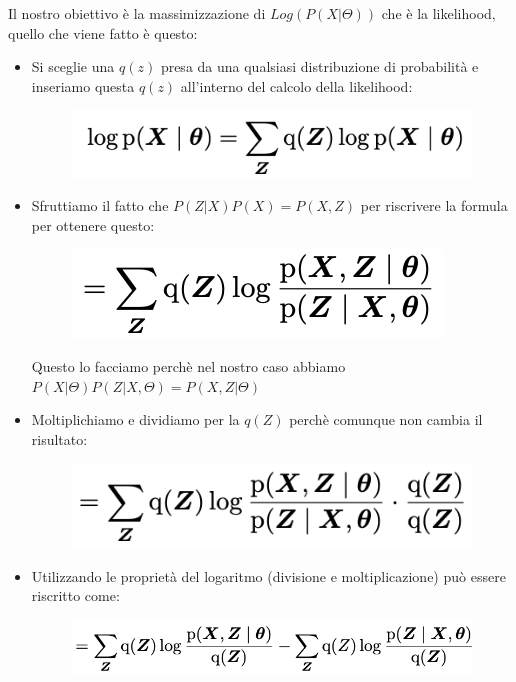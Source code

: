 \documentclass[14pt]{extreport}
\begin{document}
Il nostro obiettivo è la massimizzazione di $Log(P(X|\Theta))$ che è la likelihood, quello che viene fatto è questo:
\begin{itemize}
	\item Si sceglie una $q(z)$ presa da una qualsiasi distribuzione di probabilità e inseriamo questa $q(z)$ all'interno del calcolo della
	likelihood:
	      \begin{figure}[H]
		      \centering
		      \includegraphics[width=0.7\linewidth]{558.jpeg}
	      \end{figure}
	\item Sfruttiamo il fatto che $P(Z|X)P(X) = P(X,Z)$ per riscrivere la formula per ottenere questo:
	      \begin{figure}[H]
		      \centering
		      \includegraphics[width=0.7\linewidth]{559.jpeg}
	      \end{figure}
	      Questo lo facciamo perchè nel nostro caso abbiamo $P(X|\Theta)P(Z|X,\Theta) = P(X,Z|\Theta)$
	\item Moltiplichiamo e dividiamo per la $q(Z)$ perchè comunque non cambia il risultato:
	      \begin{figure}[H]
		      \centering
		      \includegraphics[width=0.7\linewidth]{560.jpeg}
	      \end{figure}
	\item Utilizzando le proprietà del logaritmo (divisione e moltiplicazione) può essere riscritto come:

	      \begin{figure}[H]
		      \centering
		      \includegraphics[width=0.7\linewidth]{561.jpeg}
	      \end{figure}


\end{itemize}
\end{document}
